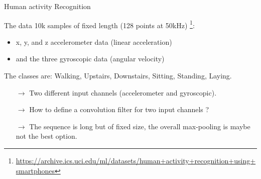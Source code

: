 \begin{frame}{Human activity Recognition}
  \begin{block}{The data}
    10k samples of fixed length (128 points at 50kHz)
    \footnote{\url{https://archive.ics.uci.edu/ml/datasets/human+activity+recognition+using+smartphones}}:
    \begin{itemize}
    \item x, y, and z accelerometer data (linear acceleration) 
    \item and the three gyroscopic data (angular velocity)
    \end{itemize}
    The classes are: Walking, Upstairs,  Downstairs,  Sitting,  Standing, Laying. 
  \end{block}
  \begin{itemize}
  \item[$\rightarrow$] Two different input channels (accelerometer and
    gyroscopic).
  \item[$\rightarrow$] How to define a convolution filter for two
    input channels ?
  \item[$\rightarrow$] The sequence is long but of fixed size, the
    overall max-pooling is maybe not the best option.
  \end{itemize}
\end{frame}


